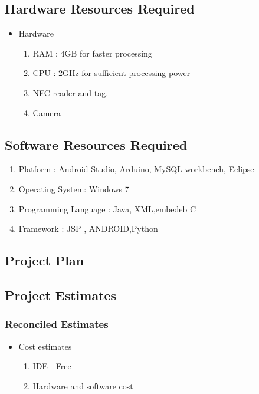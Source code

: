 \documentclass[10pt,a4paper]
{article}
\numberwithin{table}{section}
\begin{document}
{{\begin{normalsize}
\subsection{Hardware Resources Required}
\begin{itemize}
\item Hardware
\begin{enumerate}
\item RAM : 4GB for faster processing 
\item CPU : 2GHz for sufficient processing power
\item NFC reader and tag.
\item Camera
\end{enumerate}
\end{itemize}

\subsection{Software Resources Required}
\begin{enumerate}
\item Platform : Android Studio, Arduino, MySQL workbench, Eclipse
\item Operating System:  Windows 7
\item Programming Language : Java, XML,embedeb C
\item Framework : JSP , ANDROID,Python
\end{enumerate}

\newpage
\begin{center}
\begin{huge}
\section{Project Plan}
\end{huge}
\end{center}

\subsection{Project Estimates}
\subsubsection{Reconciled Estimates}
\begin{itemize}
\item {Cost estimates}
\begin{enumerate}
\item IDE - Free
\item Hardware and software cost 


\end{enumerate}
\end{itemize}
\end{normalsize}}}
\end{document}
